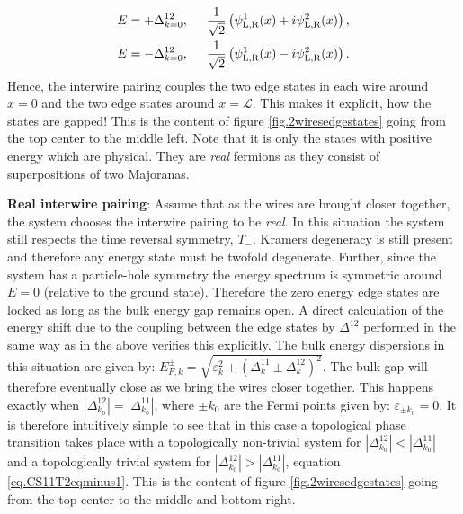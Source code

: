 \begin{align}
E &= +\Delta^{12}_{k=0}, \hspace{0.5cm} \frac{1}{\sqrt{2}}\left( \psi^1_{\text{L,R}}(x) + i\psi^2_{\text{L,R}}(x) \right), \nonumber \\
E &= -\Delta^{12}_{k=0}, \hspace{0.5cm} \frac{1}{\sqrt{2}}\left( \psi^1_{\text{L,R}}(x) - i\psi^2_{\text{L,R}}(x) \right).
\label{eq.perturbededgestates}
\end{align}
Hence, the interwire pairing couples the two edge states in each wire around $x = 0$ and the two edge states around $x = \mathcal{L}$. This makes it explicit, how the states are gapped! This is the content of figure \ref{fig.2wiresedgestates} going from the top center to the middle left. Note that it is only the states with positive energy which are physical. They are \textit{real} fermions as they consist of superpositions of two Majoranas.  

\textbf{Real interwire pairing}: Assume that as the wires are brought closer together, the system chooses the interwire pairing to be \textit{real}. In this situation the system still respects the time reversal symmetry, $T_-$. Kramers degeneracy is still present and therefore any energy state must be twofold degenerate. Further, since the system has a particle-hole symmetry the energy spectrum is symmetric around $E = 0$ (relative to the ground state). Therefore the zero energy edge states are locked as long as the bulk energy gap remains open. A direct calculation of the energy shift due to the coupling between the edge states by $\Delta^{12}$ performed in the same way as in the above verifies this explicitly. The bulk energy dispersions in this situation are given by: $E^{\pm}_{F,k} = \sqrt{\varepsilon^2_k + (\Delta^{11}_k \pm \Delta^{12}_k)^2}$. The bulk gap will therefore eventually close as we bring the wires closer together. This happens exactly when $|\Delta^{12}_{k_0}| = |\Delta^{11}_{k_0}|$, where $\pm k_0$ are the Fermi points given by: $\varepsilon_{\pm k_0} = 0$. It is therefore intuitively simple to see that in this case a topological phase transition takes place with a topologically non-trivial system for $|\Delta^{12}_{k_0}| < |\Delta^{11}_{k_0}|$ and a topologically trivial system for $|\Delta^{12}_{k_0}| > |\Delta^{11}_{k_0}|$, equation \eqref{eq.CS11T2eqminus1}. This is the content of figure \ref{fig.2wiresedgestates} going from the top center to the middle and bottom right. 

